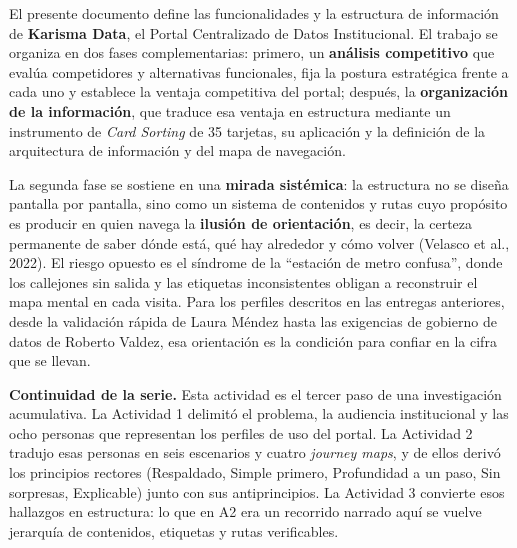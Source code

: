 
El presente documento define las funcionalidades y la estructura de información de \textbf{Karisma Data}, el Portal Centralizado de Datos Institucional. El trabajo se organiza en dos fases complementarias: primero, un \textbf{análisis competitivo} que evalúa competidores y alternativas funcionales, fija la postura estratégica frente a cada uno y establece la ventaja competitiva del portal; después, la \textbf{organización de la información}, que traduce esa ventaja en estructura mediante un instrumento de \textit{Card Sorting} de 35 tarjetas, su aplicación y la definición de la arquitectura de información y del mapa de navegación.

La segunda fase se sostiene en una \textbf{mirada sistémica}: la estructura no se diseña pantalla por pantalla, sino como un sistema de contenidos y rutas cuyo propósito es producir en quien navega la \textbf{ilusión de orientación}, es decir, la certeza permanente de saber dónde está, qué hay alrededor y cómo volver (Velasco et al., 2022). El riesgo opuesto es el síndrome de la ``estación de metro confusa'', donde los callejones sin salida y las etiquetas inconsistentes obligan a reconstruir el mapa mental en cada visita. Para los perfiles descritos en las entregas anteriores, desde la validación rápida de Laura Méndez hasta las exigencias de gobierno de datos de Roberto Valdez, esa orientación es la condición para confiar en la cifra que se llevan.

\textbf{Continuidad de la serie.} Esta actividad es el tercer paso de una investigación acumulativa. La Actividad 1 delimitó el problema, la audiencia institucional y las ocho personas que representan los perfiles de uso del portal. La Actividad 2 tradujo esas personas en seis escenarios y cuatro \textit{journey maps}, y de ellos derivó los principios rectores (Respaldado, Simple primero, Profundidad a un paso, Sin sorpresas, Explicable) junto con sus antiprincipios. La Actividad 3 convierte esos hallazgos en estructura: lo que en A2 era un recorrido narrado aquí se vuelve jerarquía de contenidos, etiquetas y rutas verificables.


